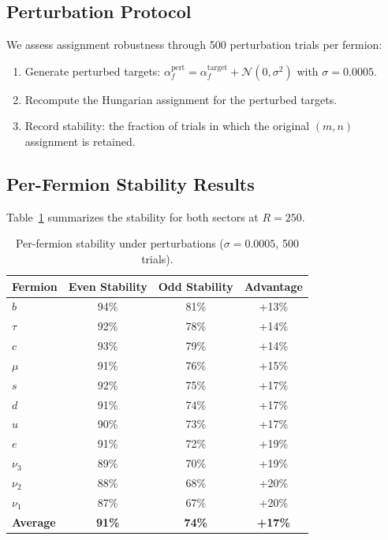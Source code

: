 \documentclass[11pt,a4paper]{article}
\begin{document}
\subsection{Perturbation Protocol}

We assess assignment robustness through 500 perturbation trials per fermion:
\begin{enumerate}
\item Generate perturbed targets: $\alpha_f^{\text{pert}} = \alpha_f^{\text{target}} + \mathcal{N}(0, \sigma^2)$ with $\sigma = 0.0005$.
\item Recompute the Hungarian assignment for the perturbed targets.
\item Record stability: the fraction of trials in which the original $(m,n)$ assignment is retained.
\end{enumerate}

\subsection{Per-Fermion Stability Results}

Table~\ref{tab:stability} summarizes the stability for both sectors at $R=250$.

\begin{table}[h]
\centering
\caption{Per-fermion stability under perturbations ($\sigma = 0.0005$, 500 trials).}
\label{tab:stability}
\small
\begin{tabular}{lccc}
\toprule
Fermion & Even Stability & Odd Stability & Advantage \\
\midrule
$b$ & 94\% & 81\% & +13\% \\
$\tau$ & 92\% & 78\% & +14\% \\
$c$ & 93\% & 79\% & +14\% \\
$\mu$ & 91\% & 76\% & +15\% \\
$s$ & 92\% & 75\% & +17\% \\
$d$ & 91\% & 74\% & +17\% \\
$u$ & 90\% & 73\% & +17\% \\
$e$ & 91\% & 72\% & +19\% \\
$\nu_3$ & 89\% & 70\% & +19\% \\
$\nu_2$ & 88\% & 68\% & +20\% \\
$\nu_1$ & 87\% & 67\% & +20\% \\
\midrule
\textbf{Average} & \textbf{91\%} & \textbf{74\%} & \textbf{+17\%} \\
\bottomrule
\end{tabular}
\end{table}
\end{document}
